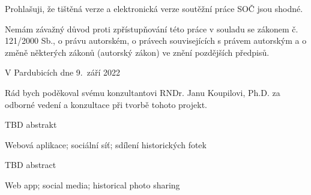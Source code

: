 \noindent Prohlašuji, že tištěná verze a elektronická verze soutěžní práce SOČ jsou shodné. 

\noindent Nemám závažný důvod proti zpřístupňování této práce v souladu se zákonem č. 121/2000 Sb., o právu autorském, o právech souvisejících s právem autorským a o změně některých zákonů (autorský zákon) ve znění pozdějších předpisů. 

\vspace{24 pt}

\noindent V Pardubicích dne 9.\ září 2022 \dotfill{} 

\hspace{8cm} \name\cleardoublepage\vspace*{0.8\textheight}

\noindent
Rád bych poděkoval svému konzultantovi RNDr. Janu Koupilovi, Ph.D. za odborné vedení a konzultace při tvorbě tohoto projekt.

\cleardoublepage{}

\noindent TBD abstrakt

\vspace{18pt}


\noindent Webová aplikace; sociální síť; sdílení historických fotek

\vspace{18pt}


\noindent TBD abstract

\vspace{18pt}


\noindent Web app; social media; historical photo sharing

\cleardoublepage\tableofcontents

\pagestyle{fancy}
\setcounter{page}{1}
